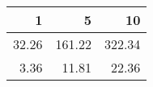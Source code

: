 \begin{tabular}{rrr}
  \hline
1 & 5 & 10 \\ 
  \hline
32.26 & 161.22 & 322.34 \\ 
  3.36 & 11.81 & 22.36 \\ 
   \hline
\end{tabular}
